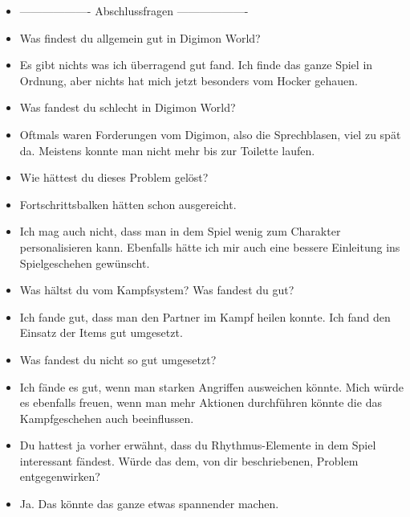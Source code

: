 {\begin{itemize}[]
    \item {-------------------} Abschlussfragen {-------------------}
    \item {} Was findest du allgemein gut in Digimon World?
    \item {} Es gibt nichts was ich überragend gut fand. Ich finde das ganze Spiel in Ordnung, aber nichts hat mich jetzt besonders vom Hocker gehauen.
    \item {} Was fandest du schlecht in Digimon World?
    \item {} Oftmals waren Forderungen vom Digimon, also die Sprechblasen, viel zu spät da. Meistens konnte man nicht mehr bis zur Toilette laufen.
    \item {} Wie hättest du dieses Problem gelöst?
    \item {} Fortschrittsbalken hätten schon ausgereicht.
    \item {} Ich mag auch nicht, dass man in dem Spiel wenig zum Charakter personalisieren kann. Ebenfalls hätte ich mir auch eine bessere Einleitung ins Spielgeschehen gewünscht.
    \item {} Was hältst du vom Kampfsystem? Was fandest du gut?
    \item {} Ich fande gut, dass man den Partner im Kampf heilen konnte. Ich fand den Einsatz der Items gut umgesetzt.
    \item {} Was fandest du nicht so gut umgesetzt?
    \item {} Ich fände es gut, wenn man starken Angriffen ausweichen könnte. Mich würde es ebenfalls freuen, wenn man mehr Aktionen durchführen könnte die das Kampfgeschehen auch beeinflussen.
    \item {} Du hattest ja vorher erwähnt, dass du Rhythmus-Elemente in dem Spiel interessant fändest. Würde das dem, von dir beschriebenen, Problem entgegenwirken?
    \item {} Ja. Das könnte das ganze etwas spannender machen.
\end{itemize}}
\nolinenumbers